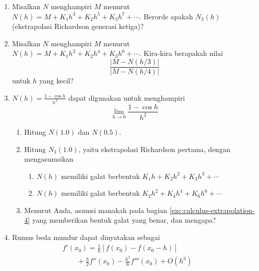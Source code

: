 \begin{enumerate}
\begin{enumerate}
\item Gunakan rumus ini dan nilai-nilai pada $\ref{eq:richardsonC2}$ untuk
memverifikasi bahwa $c_{2}\approx1.24$.
\item Hampiri $c_{3}$ menggunakan nilai-nilai pada \ref{eq:richardsonC3}.
\item Hampiri $c_{4}$ menggunakan nilai-nilai pada \ref{eq:richardsonC4}.
\item Bandingkan hampiran-hampiran untuk $c_{1},c_{2},c_{3},c_{4}$ ini
dengan nilai-nilai eksak pada kudapan \ref{crumpet:eApproximate}.
\end{enumerate}
\item \label{exc:calculus-extrapolation-1}Misalkan $N$ menghampiri $M$
menurut $N(h)=M+K_{1}h^{3}+K_{2}h^{5}+K_{3}h^{7}+\cdots$. Berorde
apakah $N_{3}(h)$ (ekstrapolasi Richardson generasi ketiga)? \hasananswer 
\item \label{exc:calculus-extrapolation-2}Misalkan $N$ menghampiri $M$
menurut $N(h)=M+K_{1}h^{2}+K_{2}h^{4}+K_{3}h^{6}+\cdots$. Kira-kira
berapakah nilai 
\[
\frac{\left|M-N(h/3)\right|}{\left|M-N(h/4)\right|}
\]
 untuk $h$ yang kecil? \hasananswer 
\item \label{exc:calculus-extrapolation-3}$N(h)=\frac{1-\cos h}{h^{2}}$
dapat digunakan untuk menghampiri \hasananswer  
\[
\lim_{h\to0}\frac{1-\cos h}{h^{2}}
\]

\begin{enumerate}
\item Hitung $N(1.0)$ dan $N(0.5)$.
\item \label{exc:calculus-extrapolation-4}Hitung $N_{1}(1.0)$, yaitu ekstrapolasi
Richardson pertama, dengan mengasumsikan

\begin{enumerate}
\item $N(h)$ memiliki galat berbentuk $K_{1}h+K_{2}h^{2}+K_{3}h^{3}+\cdots$
\item $N(h)$ memiliki galat berbentuk $K_{2}h^{2}+K_{4}h^{4}+K_{6}h^{6}+\cdots$
\end{enumerate}
\item Menurut Anda, asumsi manakah pada bagian \ref{exc:calculus-extrapolation-4}
yang memberikan bentuk galat yang benar, dan mengapa?
\end{enumerate}
\item Rumus beda mundur dapat dinyatakan sebagai
\[
\begin{gathered}f'(x_{0})=\frac{1}{h}[f(x_{0})-f(x_{0}-h)]\qquad\qquad\\
\qquad+\frac{h}{2}f''(x_{0})-\frac{h^{2}}{6}f'''(x_{0})+O(h^{3})
\end{gathered}
\]


\end{enumerate}
